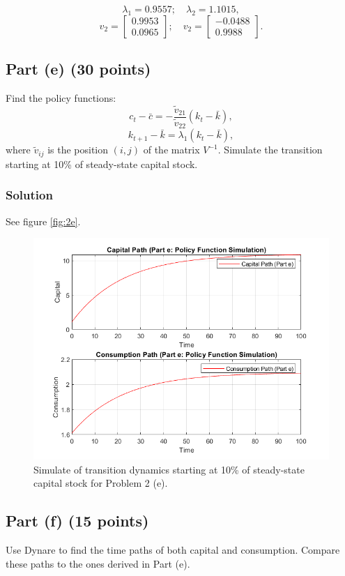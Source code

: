 \documentclass[12pt]{article}
\begin{document}
\[ \lambda_1 = 0.9557; \quad \lambda_2 =  1.1015, \]        
\[  v_2  = \begin{bmatrix}0.9953 \\
      0.0965\end{bmatrix}; \quad v_2  = \begin{bmatrix}-0.0488 \\0.9988\end{bmatrix}.\]
   
\subsection*{Part (e) (30 points)}
Find the policy functions:
\[
c_t - \bar{c} = -\frac{\tilde{v}_{21}}{\tilde{v}_{22}} (k_t - \bar{k}),
\]
\[
k_{t+1} - \bar{k} = \lambda_1 (k_t - \bar{k}),
\]
where \( \tilde{v}_{ij} \) is the position \((i, j)\) of the matrix \( V^{-1} \). Simulate the transition starting at 10\% of steady-state capital stock.
\subsubsection*{Solution}
See figure \eqref{fig:2e}.

\begin{figure}[H]
    \centering
        \includegraphics[width=\textwidth]{pset3_2e.png}
        \caption{Simulate of transition dynamics starting at 10\% of steady-state capital stock for Problem 2 (e).}
        \label{fig:2e}
\end{figure}

\subsection*{Part (f) (15 points)}
Use Dynare to find the time paths of both capital and consumption. Compare these paths to the ones derived in Part (e).
\end{document}

